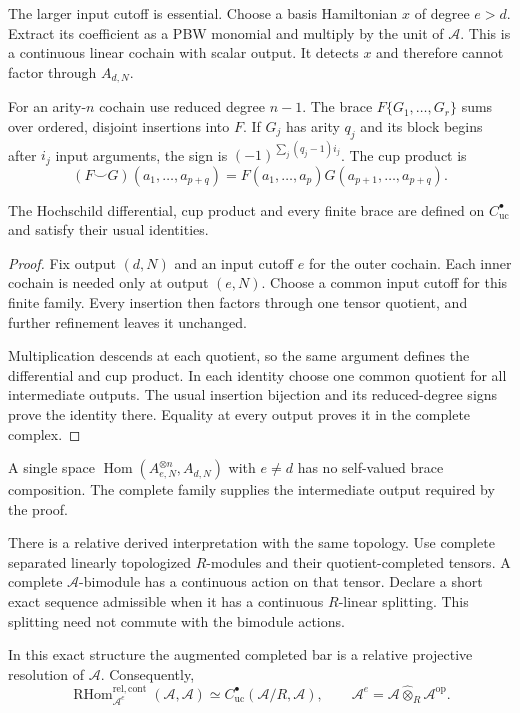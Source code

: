 The larger input cutoff is essential. Choose a basis Hamiltonian
$x$ of degree $e>d$. Extract its coefficient as a PBW monomial
and multiply by the unit of $\mathcal A$. This is a continuous
linear cochain with scalar output. It detects $x$ and therefore
cannot factor through $A_{d,N}$.

For an arity-$n$ cochain use reduced degree $n-1$.
The brace $F\{G_1,\ldots,G_r\}$ sums over ordered, disjoint
insertions into $F$. If $G_j$ has arity $q_j$ and its block begins
after $i_j$ input arguments, the sign is
$(-1)^{\sum_j(q_j-1)i_j}$. The cup product is
\[
 (F\smile G)(a_1,\ldots,a_{p+q})
   =F(a_1,\ldots,a_p)G(a_{p+1},\ldots,a_{p+q}).
\]

\begin{proposition}\label{mht:prop:continuous-braces}
The Hochschild differential, cup product and every finite brace
are defined on $C^\bullet_{\mathrm{uc}}$ and satisfy their
usual identities.
\end{proposition}

\begin{proof}
Fix output $(d,N)$ and an input cutoff $e$ for the outer cochain.
Each inner cochain is needed only at output $(e,N)$.
Choose a common input cutoff for this finite family.
Every insertion then factors through one tensor quotient, and
further refinement leaves it unchanged.

Multiplication descends at each quotient, so the same argument
defines the differential and cup product. In each identity choose
one common quotient for all intermediate outputs.
The usual insertion bijection and its reduced-degree signs prove
the identity there. Equality at every output proves it in the
complete complex.
\end{proof}

A single space
$\operatorname{Hom}(A_{e,N}^{\otimes n},A_{d,N})$ with $e\ne d$
has no self-valued brace composition. The complete family supplies
the intermediate output required by the proof.

There is a relative derived interpretation with the same topology.
Use complete separated linearly topologized $R$-modules and their
quotient-completed tensors. A complete $\mathcal A$-bimodule has
a continuous action on that tensor. Declare a short exact sequence
admissible when it has a continuous $R$-linear splitting.
This splitting need not commute with the bimodule actions.

\begin{proposition}\label{mht:prop:continuous-relative-bar}
In this exact structure the augmented completed bar is a relative
projective resolution of $\mathcal A$. Consequently,
\[
 \operatorname{RHom}^{\mathrm{rel,cont}}_{\mathcal A^e}
                (\mathcal A,\mathcal A)
 \simeq C^\bullet_{\mathrm{uc}}(\mathcal A/R,\mathcal A),
 \qquad
 \mathcal A^e=\mathcal A\widehat\otimes_R\mathcal A^{\mathrm{op}}.
\]
\end{proposition}

